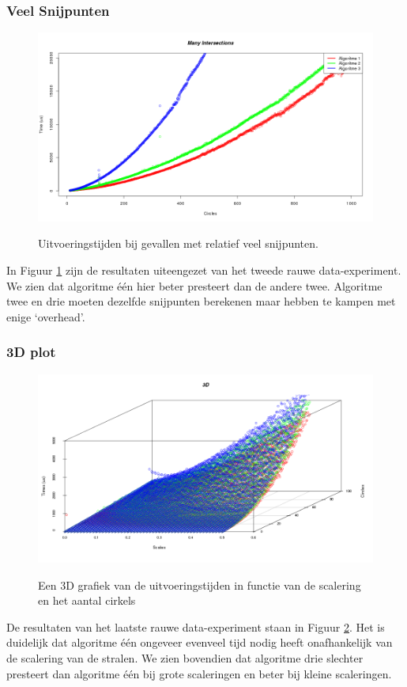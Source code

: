 \subsubsection{Veel Snijpunten}
\begin{figure}[H]
   	\centering
   	\includegraphics[width=\textwidth]{illustraties/manyIntersections.png}
   	\label{fig:many_intersections}
  	\caption{Uitvoeringstijden bij gevallen met relatief veel snijpunten.}
\end{figure}
In Figuur \ref{fig:many_intersections} zijn de resultaten uiteengezet van het tweede rauwe data-experiment. We zien dat algoritme \'e\'en hier beter presteert dan de andere twee. Algoritme twee en drie moeten dezelfde snijpunten berekenen maar hebben te kampen met enige `overhead'.

\subsubsection{3D plot}
\begin{figure}[H]
   	\centering
   	\includegraphics[width=\textwidth]{illustraties/3DScatter.png}
	\label{fig:3d}
  	\caption{Een 3D grafiek van de uitvoeringstijden in functie van de scalering en het aantal cirkels}
\end{figure}
De resultaten van het laatste rauwe data-experiment staan in Figuur \ref{fig:3d}.
Het is duidelijk dat algoritme \'e\'en ongeveer evenveel tijd nodig heeft onafhankelijk van de scalering van de stralen. We zien bovendien dat algoritme drie slechter presteert dan algoritme \'e\'en bij grote scaleringen en beter bij kleine scaleringen.

